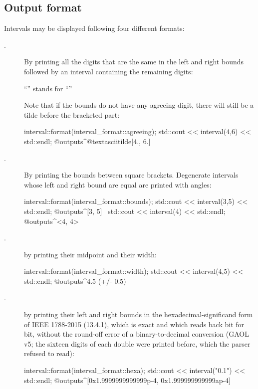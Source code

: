 \documentclass{manual}
\newcommand{\itv}[2]{\ensuremath{[#1,\,#2]}}
\begin{document}
\subsection{Output format}\label{sec:output-format}

Intervals may be displayed following four different formats:
\begin{description}
\item[.] By printing all the digits that are the same in the left and right bounds
followed by an interval containing the remaining digits:
\begin{center}
``\element{3.141\textasciitilde[5926, 6001]}'' stands for
``\element{\itv{3.1415926}{3.1416001}}''
\end{center}
Note that if the bounds do not have any agreeing digit, there will still be a tilde before the bracketed part:
\begin{example}
 interval::format(interval_format::agreeing);
 std::cout << interval(4,6) << std::endl;
 @outputs^@textasciitilde[4., 6.]~
\end{example}

\item[.] By printing the bounds between square brackets.
Degenerate intervals whose left and right bound are equal are printed with angles:
\begin{example}
 interval::format(interval_format::bounds);
 std::cout << interval(3,5) << std::endl;
 @outputs^[3, 5]~
 std::cout << interval(4) << std::endl;
 @outputs^<4, 4>~
\end{example}

\item[.] by printing their midpoint and their width:
\begin{example}
 interval::format(interval_format::width);
 std::cout << interval(4,5) << std::endl;
 @outputs^4.5 (+/- 0.5)~
\end{example}

\item[.] by printing their left and right bounds in the
hexadecimal-significand form of IEEE 1788-2015 (13.4.1), which is exact and which
 reads back bit for bit, without the round-off error of a
binary-to-decimal conversion (GAOL v5; the sixteen digits of each double were printed
before, which the parser refused to read):
\begin{example}
 interval::format(interval_format::hexa);
 std::cout << interval("0.1") << std::endl;
 @outputs^[0x1.9999999999999p-4, 0x1.999999999999ap-4]~
\end{example}

\end{description}
\end{document}
